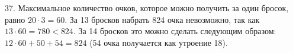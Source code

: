 37. Максимальное количество очков, которое можно получить за один бросок, равно $20\cdot3=60.$ За 13 бросков набрать 824 очка невозможно, так как $13\cdot60=780<824.$ За 14 бросков это можно сделать следующим образом: $12\cdot60+50+54=824$ (54 очка получается как утроение 18).\\
